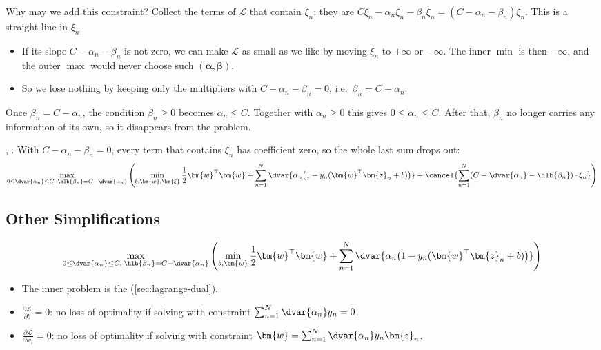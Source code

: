 Why may we add this constraint? Collect the terms of \(\mathcal{L}\) that
contain \(\xi_n\): they are \(C \xi_n - \alpha_n \xi_n - \beta_n \xi_n = (C
- \alpha_n - \beta_n) \xi_n\). This is a straight line in \(\xi_n\).
\begin{itemize}
    \item If its slope \(C - \alpha_n - \beta_n\) is not zero, we can make
        \(\mathcal{L}\) as small as we like by moving \(\xi_n\) to \(+\infty\)
        or \(-\infty\). The inner \(\min\) is then \(-\infty\), and the outer
        \(\max\) would never choose such \((\bm{\alpha}, \bm{\beta})\).
    \item So we lose nothing by keeping only the multipliers with \(C -
        \alpha_n - \beta_n = 0\), i.e.\ \(\beta_n = C - \alpha_n\).
\end{itemize}
Once \(\beta_n = C - \alpha_n\), the condition \(\beta_n \ge 0\) becomes
\(\alpha_n \le C\). Together with \(\alpha_n \ge 0\) this gives \(0 \le
\alpha_n \le C\). After that, \(\beta_n\) no longer carries any information
of its own, so it disappears from the problem.

, . With \(C - \alpha_n - \beta_n = 0\), every term that
contains \(\xi_n\) has coefficient zero, so the whole last sum drops out:
\[
    \max_{0 \le \dvar{\alpha_n} \le C, \; \hlb{\beta_n} = C -
    \dvar{\alpha_n}} \left( \min_{b, \bm{w}, \bm{\xi}} \frac{1}{2}
    \bm{w}^\top \bm{w} + \sum_{n=1}^N \dvar{\alpha_n \bigl( 1 - y_n
    (\bm{w}^\top \bm{z}_n + b) \bigr)} + \cancel{\sum_{n=1}^N (C -
    \dvar{\alpha_n} - \hlb{\beta_n}) \cdot \xi_n} \right)
\]

\subsection{Other Simplifications}

\[
    \max_{0 \le \dvar{\alpha_n} \le C, \; \hlb{\beta_n} = C -
    \dvar{\alpha_n}} \left( \min_{b, \bm{w}} \frac{1}{2} \bm{w}^\top \bm{w}
    + \sum_{n=1}^N \dvar{\alpha_n \bigl( 1 - y_n (\bm{w}^\top \bm{z}_n + b)
    \bigr)} \right)
\]

\begin{itemize}
    \item The inner problem is the 
        (\autoref{sec:lagrange-dual}).
    \item \(\frac{\partial \mathcal{L}}{\partial b} = 0\): no loss of
        optimality if solving with constraint \(\sum_{n=1}^N
        \dvar{\alpha_n} y_n = 0\).
    \item \(\frac{\partial \mathcal{L}}{\partial w_i} = 0\): no loss of
        optimality if solving with constraint \(\bm{w} = \sum_{n=1}^N
        \dvar{\alpha_n} y_n \bm{z}_n\).
\end{itemize}

